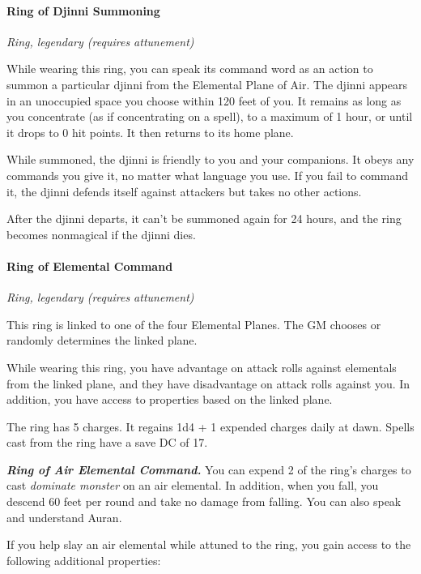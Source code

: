 \documentclass[
]{article}
\begin{document}
\hypertarget{ring-of-djinni-summoning}{%
\paragraph{Ring of Djinni Summoning}\label{ring-of-djinni-summoning}}

\emph{Ring, legendary (requires attunement)}

While wearing this ring, you can speak its command word as an action to
summon a particular djinni from the Elemental Plane of Air. The djinni
appears in an unoccupied space you choose within 120 feet of you. It
remains as long as you concentrate (as if concentrating on a spell), to
a maximum of 1 hour, or until it drops to 0 hit points. It then returns
to its home plane.

While summoned, the djinni is friendly to you and your companions. It
obeys any commands you give it, no matter what language you use. If you
fail to command it, the djinni defends itself against attackers but
takes no other actions.

After the djinni departs, it can't be summoned again for 24 hours, and
the ring becomes nonmagical if the djinni dies.

\hypertarget{ring-of-elemental-command}{%
\paragraph{Ring of Elemental Command}\label{ring-of-elemental-command}}

\emph{Ring, legendary (requires attunement)}

This ring is linked to one of the four Elemental Planes. The GM chooses
or randomly determines the linked plane.

While wearing this ring, you have advantage on attack rolls against
elementals from the linked plane, and they have disadvantage on attack
rolls against you. In addition, you have access to properties based on
the linked plane.

The ring has 5 charges. It regains 1d4 + 1 expended charges daily at
dawn. Spells cast from the ring have a save DC of 17.

\emph{\textbf{Ring of Air Elemental Command.}} You can expend 2 of the
ring's charges to cast \emph{dominate monster} on an air elemental. In
addition, when you fall, you descend 60 feet per round and take no
damage from falling. You can also speak and understand Auran.

If you help slay an air elemental while attuned to the ring, you gain
access to the following additional properties:
\end{document}
